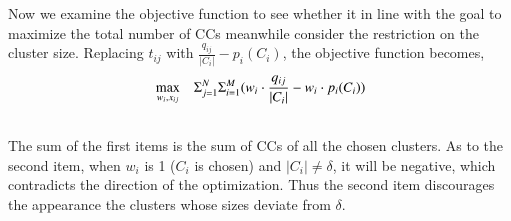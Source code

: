 \documentclass[10pt,journal,compsoc]{IEEEtran}
\theoremstyle{mytheoremstyle}
\theoremstyle{mytheoremstyle}
\theoremstyle{mytheoremstyle}
\begin{document}

Now we examine the objective function to see whether it in line with the goal to maximize the total number of CCs meanwhile consider the restriction on the cluster size.
Replacing $t_{ij}$ with $\frac{q_{ij}}{|C_i|} - p_i(C_i)$, the objective function becomes,
\begin{equation}
\begin{aligned}
     &\max\limits_{w_i, x_{ij}} && \Sigma_{j=1}^N\Sigma_{i=1}^M (w_i\cdot \frac{q_{ij}}{|C_i|} - w_i\cdot p_i(C_i)) \\
\notag
\end{aligned}
\label{centralized_opt}
\end{equation}
The sum of the first items is the sum of CCs of all the chosen clusters.
As to the second item, when $w_i$ is 1 ($C_i$ is chosen) and $|C_i|\neq\delta$, it will be negative, which contradicts the direction of the optimization.
Thus the second item discourages the appearance the clusters whose sizes deviate from $\delta$.

\end{document}
